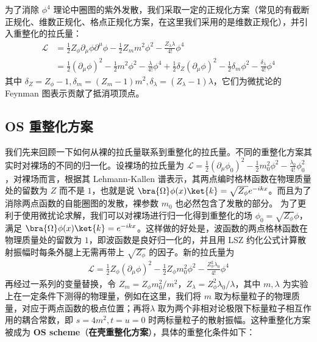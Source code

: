 为了消除 $\phi^4$ 理论中圈图的紫外发散，我们采取一定的正规化方案（常见的有截断正规化、维数正规化、格点正规化方案，在这里我们采用的是维数正规化），并引入重整化的拉氏量：
\begin{equation}
\begin{aligned}
\mathcal{L}
&=\frac{1}{2}Z_\phi \partial_\mu \phi \partial^\mu \phi - \frac{1}{2} Z_m m^2\phi^2 - \frac{Z_\lambda \lambda}{4!}\phi^4\\
&=\frac{1}{2}(\partial_\mu\phi)^2 - \frac{1}{2}m^2\phi^2 - \frac{\lambda}{4!}\phi^4+\frac{1}{2}\delta_Z (\partial_\mu \phi)^2 - \frac{1}{2}\delta_m \phi^2 - \frac{\delta_\lambda}{4!}\phi^4
\end{aligned}
\end{equation}
其中 $\delta_Z=Z_\phi-1,\delta_m = (Z_m-1)m^2,\delta_\lambda = (Z_\lambda-1)\lambda$，它们为微扰论的 Feynman 图表示贡献了抵消项顶点。

\subsection{OS 重整化方案}
我们先来回顾一下如何从裸的拉氏量联系到重整化的拉氏量。不同的重整化方案其实时对裸场的不同的归一化。设裸场的拉氏量为 $\mathcal{L}=\frac{1}{2} (\partial_\mu \phi_0)^2 - \frac{1}{2} m_0^2 \phi^2 - \frac{\lambda_0}{4!}\phi_0^2$，对裸场而言，根据其 Lehmann-Kallen 谱表示，其两点编时格林函数在物理质量处的留数为 $Z$ 而不是 $1$，也就是说 $\bra{\Omega}\phi(x) \ket{k}=\sqrt{Z_\phi}e^{-ikx}$。而且为了消除两点函数的自能圈图的发散，裸参数 $m_0$ 也必然包含了发散的部分。
为了更利于使用微扰论求解，我们可以对裸场进行归一化得到重整化的场 $\phi_0 = \sqrt{Z_\phi}\phi$，满足 $\bra{\Omega}\phi(x)\ket{k} = e^{-ikx}$。这样做的好处是，波函数的两点格林函数在物理质量处的留数为 $1$，即波函数是良好归一化的，并且用 LSZ 约化公式计算散射振幅时每条外腿上无需再带上 $\sqrt{Z_\phi}$ 的因子。新的拉氏量为
\begin{equation}
\begin{aligned}
\mathcal{L} = \frac{1}{2}Z_\phi (\partial_\mu\phi)^2 - \frac{1}{2} Z_\phi m_0^2 \phi^2 - \frac{Z_\phi^2\lambda_0}{4!} \phi^4
\end{aligned}
\end{equation}
再经过一系列的变量替换，令 $Z_m = Z_\phi m_0^2/m^2$，$Z_\lambda = Z_\phi^2 \lambda_0/\lambda$，其中 $m,\lambda$ 为实验上在一定条件下测得的物理量，例如在这里，我们将 $m$ 取为标量粒子的物理质量，对应于两点函数的极点位置；再将$\lambda$ 取为两个非相对论极限下标量粒子相互作用的耦合常数，即 $s=4m^2,t=u=0$ 时两标量粒子的散射振幅。这种重整化方案被成为 \textbf{OS scheme}（\textbf{在壳重整化方案}），具体的重整化条件如下：

